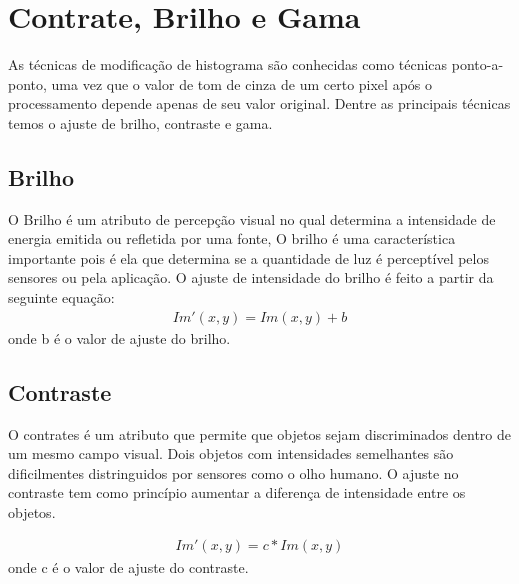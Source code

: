 \documentclass[
	article,			%
	11pt,				%
	oneside,			%
	a4paper,			%
	english,			%
	brazil,				%
	sumario=tradicional
	]{abntex2}
\begin{document}
\section{Contrate, Brilho e Gama}
As técnicas de modificação de histograma são conhecidas como técnicas ponto-a-ponto, uma
vez que o valor de tom de cinza de um certo pixel após o processamento depende apenas de seu
valor original. Dentre as principais técnicas temos o ajuste de brilho,
contraste e gama.\cite{1}

\subsection{Brilho}
O Brilho é um atributo de percepção visual no qual determina a intensidade de
energia emitida ou refletida por uma fonte, O brilho é uma característica
importante pois é ela que determina se a quantidade de luz é perceptível pelos
sensores ou pela aplicação. O ajuste de intensidade do brilho é feito a partir
da seguinte equação:
\begin{align}
Im'(x,y) = Im(x,y) + b
\end{align}
onde b é o valor de ajuste do brilho.


\subsection{Contraste}
O contrates é um atributo que permite que objetos sejam discriminados dentro de
um mesmo campo visual. Dois objetos com intensidades semelhantes são
dificilmentes distringuidos por sensores como o olho humano. O ajuste no
contraste tem como princípio aumentar a diferença de intensidade entre os
objetos.

\begin{align}
Im'(x,y) = c * Im(x,y)
\end{align}
onde c é o valor de ajuste do contraste.
\end{document}
